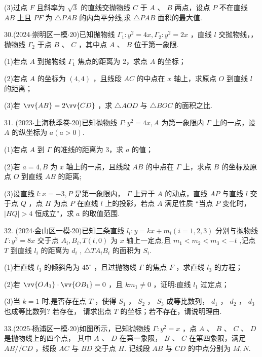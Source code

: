 (3)过点 $F$ 且斜率为 $\sqrt{3}$ 的直线交抛物线 $C$ 于 $A$ 、 $B$ 两点，设点 $P$ 不在直线 ${AB}$ 上且 ${PF}$ 为 $\bigtriangleup {PAB}$ 的内角平分线,求 $\bigtriangleup {PAB}$ 面积的最大值.

30.(2024$\cdot$崇明区一模$\cdot$20)已知抛物线 ${\Gamma }_{1} : {y}^{2} = {4x},{\Gamma }_{2} : {y}^{2} = {2x}$ ，直线 $l$ 交抛物线，\blkda[2]{}， 抛物线 ${\Gamma }_{2}$ 于点 $B$ 、 $C$ ，其中点 $A$ 、 $B$ 位于第一象限.

(1)若点 $A$ 到抛物线 ${\Gamma }_{1}$ 焦点的距离为 2，求点 $A$ 的坐标；

(2)若点 $A$ 的坐标为 $\left( {4,4}\right)$ ，且线段 ${AC}$ 的中点在 $x$ 轴上，求原点 $O$ 到直线 $l$ 的距离；

(3)若 $\vv{AB} = 2\vv{CD}$ ，求 $\bigtriangleup  {AOD}$ 与 $\bigtriangleup  {BOC}$ 的面积之比.

31. (2023$\cdot$上海秋季卷$\cdot$20)已知抛物线 $\Gamma  : {y}^{2} = {4x},A$ 为第一象限内 $\Gamma$ 上的一点，设 $A$ 的纵坐标为 $a\left( {a > 0}\right)$.

(1)若点 $A$ 到 $\Gamma$ 的准线的距离为 3，求 $a$ 的值；

(2)若 $a = 4,B$ 为 $x$ 轴上的一点，且线段 ${AB}$ 的中点在 $\Gamma$ 上，求点 $B$ 的坐标及原点 $O$ 到直线 ${AB}$ 的距离;

(3)设直线 $l : x =  - 3,P$ 是第一象限内， $\Gamma$ 上异于 $A$ 的动点，直线 ${AP}$ 与直线 $l$ 交于点 $Q$ ，点 $H$ 为点 $P$ 在直线 $l$ 上的投影，若点 $A$ 满足性质 “当点 $P$ 变化时， $\left| {HQ}\right|  > 4$ 恒成立”，求 $a$ 的取值范围.

32. (2024$\cdot$金山区一模$\cdot$20)已知三条直线 ${l}_{i} : y = {kx} + {m}_{i}\left( {i = 1,2,3}\right)$ 分别与抛物线 $\Gamma  : {y}^{2} = {8x}$ 交于点 ${A}_{i},{B}_{i},T\left( {t,0}\right)$ 为 $x$ 轴上一定点,且 ${m}_{1} < {m}_{2} < {m}_{3} <  - t$ ,记点 $T$ 到直线 ${l}_{i}$ 的距离为 ${d}_{i}$ , $\bigtriangleup T{A}_{i}{B}_{i}$ 的面积为 ${S}_{i}$.

(1)若直线 ${l}_{3}$ 的倾斜角为 ${45}^{ \circ  }$ ，且过抛物线 $\Gamma$ 的焦点 $F$ ，求直线 ${l}_{3}$ 的方程；

(2)若 $\vv{O{A}_{1}} \cdot  \vv{O{B}_{1}} = 0$ ，且 $k{m}_{1} \neq  0$ ，证明:直线 ${l}_{1}$ 过定点；

(3)当 $k = 1$ 时,是否存在点 $T$ ，使得 ${S}_{1}$ ， ${S}_{2}$ ， ${S}_{3}$ 成等比数列， ${d}_{1}$ ， ${d}_{2}$ ， ${d}_{3}$ 也成等比数列? 若存在， 请求出点 $T$ 的坐标；若不存在，请说明理由.

33.(2025$\cdot$杨浦区一模$\cdot$20)如图所示，已知抛物线 $\Gamma  : {y}^{2} = x$ ，点 $A$ 、 $B$ 、 $C$ 、 $D$ 是抛物线上的四个点， 其中 $A$ 、 $D$ 在第一象限， $B$ 、 $C$ 在第四象限，满足 ${AB}//{CD}$ ，线段 ${AC}$ 与 ${BD}$ 交于点 $H$. 记线段 ${AB}$ 与 ${CD}$ 的中点分别为 $M,N$.

